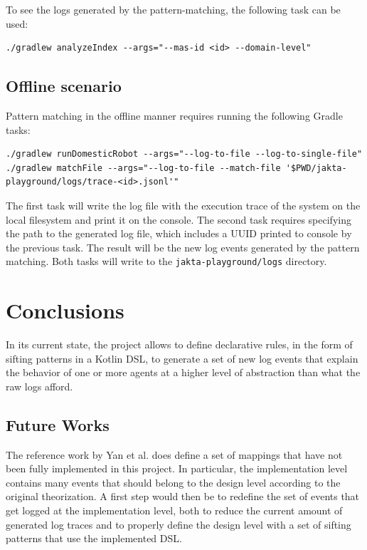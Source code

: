 \documentclass{scrartcl}
\begin{document}
To see the logs generated by the pattern-matching, the following task can be used:

\begin{verbatim}
./gradlew analyzeIndex --args="--mas-id <id> --domain-level"
\end{verbatim}

\subsection{Offline scenario}

Pattern matching in the offline manner requires running the following Gradle tasks:

\begin{verbatim}
./gradlew runDomesticRobot --args="--log-to-file --log-to-single-file"
./gradlew matchFile --args="--log-to-file --match-file '$PWD/jakta-playground/logs/trace-<id>.jsonl'"
\end{verbatim}

The first task will write the log file with the execution trace of the system on the local filesystem and print it on the console.
%
The second task requires specifying the path to the generated log file, which includes a UUID printed to console by the previous task. The result will be the new log events generated by the pattern matching.
%
Both tasks will write to the \verb|jakta-playground/logs| directory.

\section{Conclusions}

In its current state, the project allows to define declarative rules, in the form of sifting patterns in a Kotlin DSL, to generate a set of new log events that explain the behavior of one or more agents at a higher level of abstraction than what the raw logs afford.

\subsection{Future Works}

The reference work by Yan et al. \cite{DBLP:journals/aamas/YanBHR25} does define a set of mappings that have not been fully implemented in this project.
%
In particular, the implementation level contains many events that should belong to the design level according to the original theorization.
%
A first step would then be to redefine the set of events that get logged at the implementation level, both to reduce the current amount of generated log traces and to properly define the design level with a set of sifting patterns that use the implemented DSL.
\end{document}

